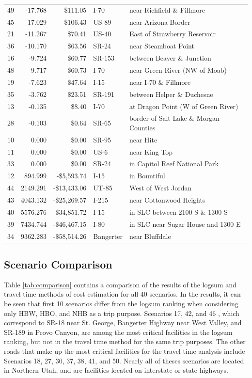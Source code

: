 \begin{table}
\begin{tabular}[t]{crrll}
49 & -17.768 & \$111.05 & I-70 & near Richfield \& Fillmore\\
45 & -17.029 & \$106.43 & US-89 & near Arizona Border\\
21 & -11.267 & \$70.41 & US-40 & East of Strawberry Reservoir\\
36 & -10.170 & \$63.56 & SR-24 & near Steamboat Point\\
16 & -9.724 & \$60.77 & SR-153 & between Beaver \& Junction\\
48 & -9.717 & \$60.73 & I-70 & near Green River (NW of Moab)\\
19 & -7.623 & \$47.64 & I-15 & near I-70 \& Fillmore\\
35 & -3.762 & \$23.51 & SR-191 & between Helper \& Duchesne\\
13 & -0.135 & \$8.40 & I-70 & at Dragon Point (W of Green River)\\
28 & -0.103 & \$0.64 & SR-65 & border of Salt Lake \& Morgan Counties\\
10 & 0.000 & \$0.00 & SR-95 & near Hite\\
11 & 0.000 & \$0.00 & US-6 & near King Top\\
33 & 0.000 & \$0.00 & SR-24 & in Capitol Reef National Park\\
12 & 894.999 & -\$5,593.74 & I-15 & in Bountiful\\
44 & 2149.291 & -\$13,433.06 & UT-85 & West of West Jordan\\
43 & 4043.132 & -\$25,269.57 & I-215 & near Cottonwood Heights\\
40 & 5576.276 & -\$34,851.72 & I-15 & in SLC between 2100 S \& 1300 S\\
39 & 7434.744 & -\$46,467.15 & I-80 & in SLC near Sugar House and 1300 E\\
34 & 9362.283 & -\$58,514.26 & Bangerter & near Bluffdale\\
\bottomrule
\end{tabular}
\end{table}


\subsection{Scenario Comparison}
Table \ref{tab:comparison} contains a comparison of the results of the logsum
and travel time methods of cost estimation for all 40 scenarios. In the results,
it can be seen that first 10 scenarios differ from the logsum ranking when considering
only HBW, HBO, and NHB as a trip purpose. Scenarios 17, 42, and 46 , which
correspond to SR-18 near St. George, Bangerter Highway near West Valley, and SR-189
in Provo Canyon, are among the
most critical facilities in the logsum ranking, but not in the travel time method
for the same trip purposes. The other roads that make up the most critical facilities
for the travel time analysis include Scenarios 18, 27, 30, 37, 38, 41, and 50.
Nearly all of theses scenarios are located in Northern Utah, and are facilities
located on interstate or state highways.

